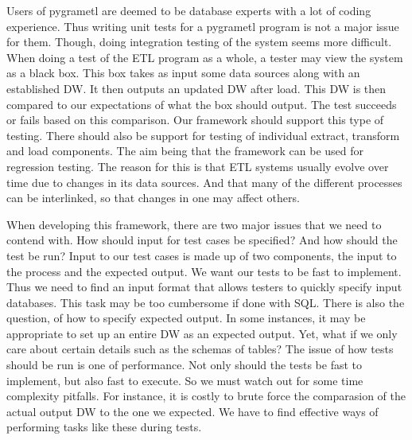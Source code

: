 Users of pygrametl are deemed to be database experts with a lot of coding experience. Thus writing unit tests for a pygrametl program is not a major issue for them. Though, doing integration testing of the system seems more difficult. When doing a test of the  ETL program as a whole, a tester may view the system as a black box. This box takes as input some data sources along with an established DW. It then outputs an updated DW after load. This DW is then compared to our expectations of what the box should output. The test succeeds or fails based on this comparison. Our framework should support this type of testing. There should also be support for testing of  individual extract, transform and load components. The aim being that the framework can be used for regression testing. The reason for this is that ETL systems usually evolve over time due to changes in its data sources. And that many of the different processes can be interlinked, so that changes in one may affect others.

When developing this framework, there are two major issues that we need to contend with. How should input for test cases be specified? And how should the test be run?  Input to our test cases is made up of two components, the input to the process and the expected output. We want our tests to be fast to implement. Thus we need to find an input format that allows testers to quickly specify input databases. This task may be too cumbersome if done with SQL. There is also the question, of how to specify expected output. In some instances, it may be appropriate to set up an entire DW as an expected output. Yet, what if we only care about certain details such as the schemas of tables? The issue of how tests should be run is one of performance. Not only should the tests be fast to implement, but also fast to execute. So we must watch out for some time complexity pitfalls. For instance, it is costly to brute force the comparasion of the actual output DW to the one we expected. We have to find effective ways of performing tasks like these during tests. 


